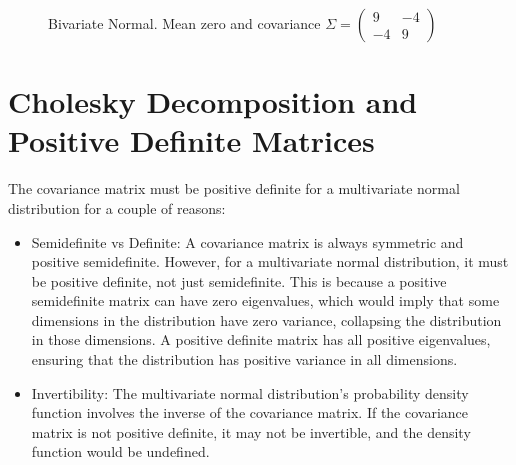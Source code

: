 \documentclass[
  letterpaper,
  DIV=11,
  numbers=noendperiod]{scrreprt}
\providecommand{\tightlist}{%
  \setlength{\itemsep}{0pt}\setlength{\parskip}{0pt}}\usepackage{longtable,booktabs,array}
\begin{document}
\begin{figure}


\caption{\label{fig-bi9449}Bivariate Normal. Mean zero and covariance
\(\Sigma=\begin{pmatrix} 9 & -4 \\ -4 & 9\end{pmatrix}\)}

\end{figure}%

\section{Cholesky Decomposition and Positive Definite
Matrices}\label{cholesky-decomposition-and-positive-definite-matrices}

The covariance matrix must be positive definite for a multivariate
normal distribution for a couple of reasons:

\begin{itemize}
\tightlist
\item
  Semidefinite vs Definite: A covariance matrix is always symmetric and
  positive semidefinite. However, for a multivariate normal
  distribution, it must be positive definite, not just semidefinite.
  This is because a positive semidefinite matrix can have zero
  eigenvalues, which would imply that some dimensions in the
  distribution have zero variance, collapsing the distribution in those
  dimensions. A positive definite matrix has all positive eigenvalues,
  ensuring that the distribution has positive variance in all
  dimensions.
\item
  Invertibility: The multivariate normal distribution's probability
  density function involves the inverse of the covariance matrix. If the
  covariance matrix is not positive definite, it may not be invertible,
  and the density function would be undefined.
\end{itemize}
\end{document}
